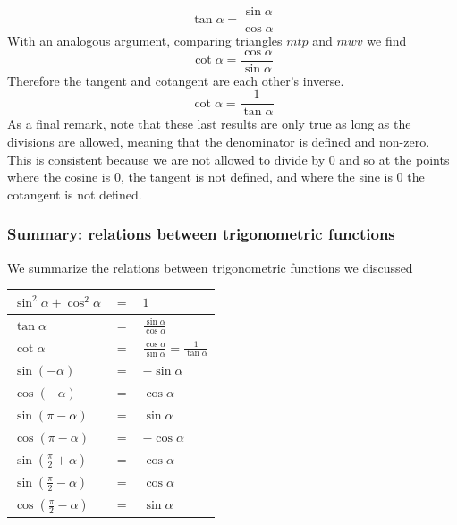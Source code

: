 $$
\tan \alpha = \frac{\sin \alpha}{\cos \alpha}
$$
\noindent With an analogous argument, comparing triangles $mtp$ and $mwv$ we find
$$
\cot \alpha = \frac{\cos \alpha}{\sin \alpha}
$$
\noindent Therefore the tangent and cotangent are each other's inverse.
$$
\cot \alpha = \frac{1}{\tan \alpha}
$$
\noindent As a final remark, note that these last results are only true as long as the divisions are allowed, meaning that the denominator is defined and non-zero. This is consistent because we are not allowed to divide by $0$ and so at the points where the cosine is $0$, the tangent is not defined, and where the sine is $0$ the cotangent is not defined.

\subsubsection{Summary: relations between trigonometric functions}

\noindent We summarize the relations between trigonometric functions we discussed
\begin{center}
\begin{tabular}{|lll|}
\hline
$\sin^2 \alpha + \cos^2 \alpha$ & $=$ & $1$ \\
\hline
$\tan \alpha $ & $ = $ & $\frac{\sin \alpha}{\cos \alpha}$\\
\hline
$\cot \alpha$ & $=$ & $ \frac{\cos \alpha}{\sin \alpha}= \frac{1}{\tan \alpha}$\\
\hline
$\sin (-\alpha)$ & $=$ & $- \sin \alpha $ \\
\hline
$\cos (-\alpha)$ & $=$ & $\cos \alpha $ \\
\hline
$\sin\left( \pi - \alpha \right)$ & $=$ & $\sin \alpha$\\
\hline
$\cos \left( \pi - \alpha \right)$ & $=$ & $- \cos \alpha$\\
\hline
$\sin \left( \frac{\pi}{2} + \alpha \right)$ & $=$ & $\cos \alpha$\\
\hline
$\sin \left( \frac{\pi}{2} - \alpha \right)$ & $=$ & $\cos \alpha$\\
\hline
$\cos \left( \frac{\pi}{2} - \alpha \right)$ & $=$ & $\sin \alpha$\\
\hline
\end{tabular}
\end{center}

